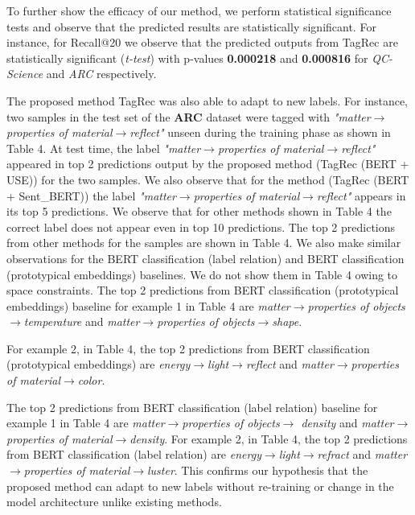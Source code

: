 \documentclass[runningheads, envcountsame, a4paper]{llncs}
\begin{document}
To further show the efficacy of our method, we perform statistical significance tests and observe that the predicted results are statistically significant. For instance, for Recall@20 we observe that the predicted outputs from TagRec are statistically significant (\textit{t-test}) with p-values \textbf{0.000218} and \textbf{0.000816} for \textit{QC-Science} and \textit{ARC} respectively.

        
\setlength{\parindent}{4ex}The proposed method TagRec was also able to adapt to new labels. For instance, two samples in the test set of the \textbf{ARC} dataset were tagged with \textit{"matter$\xrightarrow{}$properties of material$\xrightarrow{}$reflect"} unseen during the training phase as shown in Table 4. At test time, the label \textit{"matter$\xrightarrow{}$properties of material$\xrightarrow{}$reflect"} appeared in top 2 predictions output by the proposed method (TagRec (BERT + USE)) for the two samples. We also observe that for the method (TagRec (BERT + Sent\_BERT)) the label \textit{"matter$\xrightarrow{}$properties of material$\xrightarrow{}$reflect"} appears in its top 5 predictions. We observe that for other methods shown in Table 4 the correct label does not appear even in top 10 predictions. The top 2 predictions from other methods for the samples are shown in Table 4. We also make similar observations for the BERT classification (label relation) and BERT classification (prototypical embeddings) baselines. We do not show them in Table 4 owing to space constraints. The top 2 predictions from BERT classification (prototypical embeddings) baseline for example 1 in Table 4 are \textit{matter$\xrightarrow{}$properties of objects$\xrightarrow{}$temperature} and \textit{matter$\xrightarrow{}$properties of objects$\xrightarrow{}$shape}.

For example 2, in Table 4, the top 2 predictions from BERT classification (prototypical embeddings) are \textit{energy$\xrightarrow{}$light$\xrightarrow{}$reflect} and \textit{matter$\xrightarrow{}$properties of material$\xrightarrow{}$color}.

The top 2 predictions from BERT classification (label relation) baseline for example 1 in Table 4 are \textit{matter$\xrightarrow{}$properties of objects$\xrightarrow{}$ density} and \textit{matter$\xrightarrow{}$\\properties of material$\xrightarrow{}$density}. For example 2, in Table 4, the top 2 predictions from BERT classification (label relation) are \textit{energy$\xrightarrow{}$light$\xrightarrow{}$refract} and \textit{matter$\xrightarrow{}$properties of material$\xrightarrow{}$luster}. This confirms our hypothesis that the proposed method can adapt to new labels without re-training or change in the model architecture unlike existing methods. 
\end{document}
